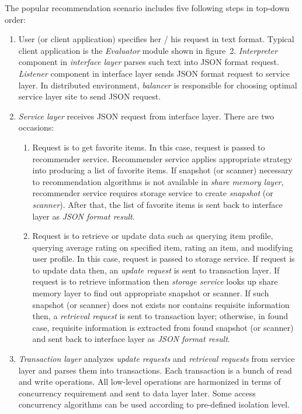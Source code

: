 \documentclass[a4paper]{llncs}
\begin{document}
The popular recommendation scenario includes five following steps in top-down order:
\begin{enumerate}
\item User (or client application) specifies her / his request in text format. Typical client application is the \textit{Evaluator} module shown in figure~2. \textit{Interpreter} component in \textit{interface layer} parses such text into JSON format request. \textit{Listener} component in interface layer sends JSON format request to service layer. In distributed environment, \textit{balancer} is responsible for choosing optimal service layer site to send JSON request.
\item \textit{Service layer} receives JSON request from interface layer. There are two occasions:
  \begin{enumerate}
  \item Request is to get favorite items. In this case, request is passed to recommender service. Recommender service applies appropriate strategy into producing a list of favorite items. If snapshot (or scanner) necessary to recommendation algorithms is not available in \textit{share memory layer}, recommender service requires storage service to create \textit{snapshot} (or \textit{scanner}). After that, the list of favorite items is sent back to interface layer as \textit{JSON format result}.
  \item Request is to retrieve or update data such as querying item profile, querying average rating on specified item, rating an item, and modifying user profile. In this case, request is passed to storage service. If request is to update data then, an \textit{update request} is sent to transaction layer. If request is to retrieve information then \textit{storage service} looks up share memory layer to find out appropriate snapshot or scanner. If such snapshot (or scanner) does not exists nor contains requisite information then, a \textit{retrieval request} is sent to transaction layer; otherwise, in found case, requisite information is extracted from found snapshot (or scanner) and sent back to interface layer as \textit{JSON format result}.
  \end{enumerate}
\item \textit{Transaction layer} analyzes \textit{update requests} and \textit{retrieval requests} from service layer and parses them into transactions. Each transaction is a bunch of read and write operations. All low-level operations are harmonized in terms of concurrency requirement and sent to data layer later. Some access concurrency algorithms can be used according to pre-defined isolation level.

\end{enumerate}
\end{document}

